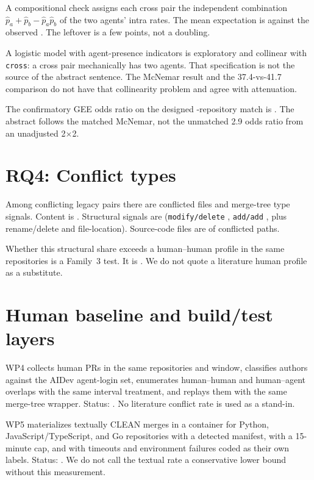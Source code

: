 \documentclass[10pt,conference]{IEEEtran}
\begin{document}
A compositional check assigns each cross pair the independent combination $\hat p_a + \hat p_b - \hat p_a\hat p_b$ of the two agents' intra rates. The mean expectation is \LegacyExpectedCross{} against the observed \LegacyObservedCross. The leftover is a few points, not a doubling.

A logistic model with agent-presence indicators is exploratory and collinear with \texttt{cross}: a cross pair mechanically has two agents. That specification is not the source of the abstract sentence. The McNemar result and the 37.4-vs-41.7 comparison do not have that collinearity problem and agree with attenuation.

The confirmatory GEE odds ratio on the designed \NReposMatched-repository match is \WPThreeStatus. The abstract follows the matched McNemar, not the unmatched 2.9 odds ratio from an unadjusted 2$\times$2.

\section{RQ4: Conflict types}
\label{sec:types}

Among \LegacyConfPairs{} conflicting legacy pairs there are \LegacyConfFiles{} conflicted files and \LegacyTypeSignals{} merge-tree type signals. Content is \LegacyContent. Structural signals are \LegacyStructural{} (\texttt{modify/delete} \LegacyModDel, \texttt{add/add} \LegacyAddAdd, plus rename/delete and file-location). Source-code files are \LegacySrcFiles{} of conflicted paths.

Whether this structural share exceeds a human--human profile in the same repositories is a Family~3 test. It is \WPFourStatus. We do not quote a literature human profile as a substitute.

\section{Human baseline and build/test layers}
\label{sec:wp45}

WP4 collects human PRs in the same repositories and window, classifies authors against the AIDev agent-login set, enumerates human--human and human--agent overlaps with the same interval treatment, and replays them with the same merge-tree wrapper. Status: \WPFourStatus. No literature conflict rate is used as a stand-in.

WP5 materializes textually CLEAN merges in a container for Python, JavaScript/TypeScript, and Go repositories with a detected manifest, with a 15-minute cap, and with timeouts and environment failures coded as their own labels. Status: \WPFiveStatus. We do not call the textual rate a conservative lower bound without this measurement.
\end{document}
